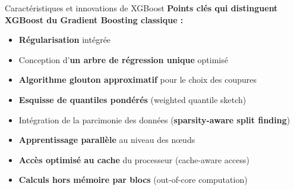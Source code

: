 \begin{frame}{Caractéristiques et innovations de XGBoost}
\textbf{Points clés qui distinguent XGBoost du Gradient Boosting classique :}
\begin{itemize}
    \item \textbf{Régularisation} intégrée 
    \item Conception d'\textbf{un arbre de régression unique} optimisé
    \item \textbf{Algorithme glouton approximatif} pour le choix des coupures
    \item \textbf{Esquisse de quantiles pondérés} (weighted quantile sketch)
    \item Intégration de la parcimonie des données (\textbf{sparsity-aware split finding})
    \item \textbf{Apprentissage parallèle} au niveau des nœuds
    \item \textbf{Accès optimisé au cache} du processeur (cache-aware access)
    \item \textbf{Calculs hors mémoire par blocs} (out-of-core computation)
\end{itemize}
\end{frame}